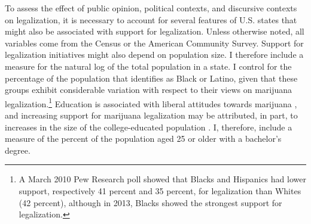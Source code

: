 To assess the effect of public opinion, political contexts, and discursive contexts on legalization, it is necessary to account for several features of U.S. states that might also be associated with support for legalization. Unless otherwise noted, all variables come from the Census or the American Community Survey. %
Support for legalization initiatives might also depend on population size. I therefore include a measure for the natural log of the total population in a state. I control for the percentage of the population that identifies as Black or Latino, given that these groups exhibit considerable variation with respect to their views on marijuana legalization.\footnote{A March 2010 Pew Research poll showed that Blacks and Hispanics had lower support, respectively 41 percent and 35 percent, for legalization than Whites (42 percent), although in 2013, Blacks showed the strongest support for legalization.} Education is associated with liberal attitudes towards marijuana \citep{pedersen_2009}, and increasing support for marijuana legalization may be attributed, in part, to increases in the size of the college-educated population \citep{rosenthal_and_kubby_1996}. I, therefore, include a measure of the percent of the population aged 25 or older with a bachelor's degree. %




